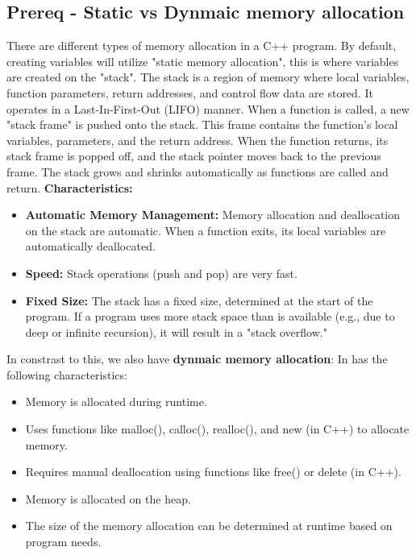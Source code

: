 \documentclass{report}
\begin{document}
    \subsection{Prereq - Static vs Dynmaic memory allocation}
    \bigbreak \noindent 
    There are different types of memory allocation in a C++ program. By default, creating variables will utilize "static memory allocation", this is where variables are created on the "stack". The stack is a region of memory where local variables, function parameters, return addresses, and control flow data are stored. It operates in a Last-In-First-Out (LIFO) manner.
    \bigbreak \noindent 
    When a function is called, a new "stack frame" is pushed onto the stack. This frame contains the function's local variables, parameters, and the return address.
    When the function returns, its stack frame is popped off, and the stack pointer moves back to the previous frame.
    The stack grows and shrinks automatically as functions are called and return.
    \bigbreak \noindent 
    \textbf{Characteristics:}
    \begin{itemize}
        \item \textbf{Automatic Memory Management:} Memory allocation and deallocation on the stack are automatic. When a function exits, its local variables are automatically deallocated.
        \item \textbf{Speed:} Stack operations (push and pop) are very fast.
        \item \textbf{Fixed Size:} The stack has a fixed size, determined at the start of the program. If a program uses more stack space than is available (e.g., due to deep or infinite recursion), it will result in a "stack overflow."
    \end{itemize}
    \bigbreak \noindent 
    In constrast to this, we also have \textbf{dynmaic memory allocation}: In has the following characteristics:
    \begin{itemize}
        \item Memory is allocated during runtime.
        \item Uses functions like malloc(), calloc(), realloc(), and new (in C++) to allocate memory.
        \item Requires manual deallocation using functions like free() or delete (in C++).
        \item Memory is allocated on the heap.
        \item The size of the memory allocation can be determined at runtime based on program needs.
    \end{itemize}
\end{document}

